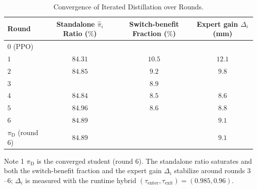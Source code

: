 \documentclass[journal, twoside]{IEEEtran}
\newcommand{\limebox}[1]{\setlength{\fboxsep}{0pt}{\colorbox{lime}{#1}}}
\newcommand{\pinkbox}[1]{\setlength{\fboxsep}{0pt}{\colorbox{yellow}{#1}}}
\begin{document}
\begin{table}[!htbp]
\centering

\caption{Convergence of Iterated Distillation over Rounds.}
\label{tab:ablate_exit}
\begin{threeparttable}
\begin{tabular}{lccc}
\toprule
Round & \shortstack{Standalone $\hat{\pi}_{i}$\\ Ratio ($\%$)} & \shortstack{Switch-benefit\\ Fraction ($\%$)} & \shortstack{Expert gain\\ $\Delta_i$ (mm)} \\
\midrule
$0$ (PPO)          & \pinkbox{$83.25$} & \pinkbox{$16.7$} & \pinkbox{$21.7$} \\
$1$                & $84.31$ & $10.5$ & $12.1$ \\
$2$                & $84.85$ & $9.2$  & $9.8$  \\
$3$                & \limebox{$85.01$} & $8.9$  & \limebox{$8.5$}  \\
$4$                & $84.84$ & $8.5$  & $8.6$  \\
$5$                & $84.96$ & $8.6$  & $8.8$  \\
$6$                & $84.89$ & \limebox{$8.3$}  & $9.1$  \\
\midrule
$\pi_{\mathrm{D}}$ (round $6$) & $84.89$ & \limebox{$8.3$} & $9.1$ \\
\bottomrule
\end{tabular}
\begin{tablenotes}
    \item[Note 1] $\pi_{\mathrm{D}}$ is the converged student (round $6$). The standalone ratio saturates and both the switch-benefit fraction and the expert gain $\Delta_i$ stabilize around rounds $3$--$6$; $\Delta_i$ is measured with the runtime hybrid $(\tau_{\mathrm{enter}},\tau_{\mathrm{exit}}){=}(0.985,0.96)$.
\end{tablenotes}
\end{threeparttable}
\end{table}
\end{document}
